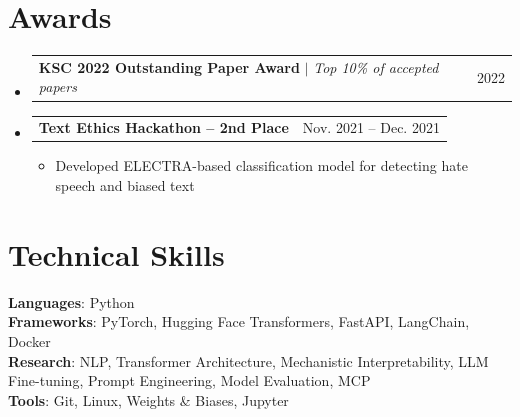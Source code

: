 \documentclass[letterpaper,11pt]{article}
\makeatletter
\newcommand{\resumeItem}[1]{
  \item\small{
    {#1 \vspace{-2pt}}
  }
}
\newcommand{\resumeProjectHeading}[2]{
    \item
    \begin{tabular*}{0.97\textwidth}{l@{\extracolsep{\fill}}r}
      \small#1 & #2 \\
    \end{tabular*}\vspace{-7pt}
}
\newcommand{\resumeSubHeadingListStart}{\begin{itemize}[leftmargin=0.15in, label={}]}
\newcommand{\resumeSubHeadingListEnd}{\end{itemize}}
\newcommand{\resumeItemListStart}{\begin{itemize}}
\newcommand{\resumeItemListEnd}{\end{itemize}\vspace{-5pt}}
\makeatother
\begin{document}
\section{Awards}
  \resumeSubHeadingListStart
    \resumeProjectHeading
      {\textbf{KSC 2022 Outstanding Paper Award} $|$ \emph{Top 10\% of accepted papers}}{2022}
    \resumeProjectHeading
      {\textbf{Text Ethics Hackathon -- 2nd Place}}{Nov. 2021 -- Dec. 2021}
      \resumeItemListStart
        \resumeItem{Developed ELECTRA-based classification model for detecting hate speech and biased text}
      \resumeItemListEnd
  \resumeSubHeadingListEnd

\section{Technical Skills}
 \begin{itemize}[leftmargin=0.15in, label={}]
    \small{\item{
     \textbf{Languages}{: Python} \\
     \textbf{Frameworks}{: PyTorch, Hugging Face Transformers, FastAPI, LangChain, Docker} \\
     \textbf{Research}{: NLP, Transformer Architecture, Mechanistic Interpretability, LLM Fine-tuning, Prompt Engineering, Model Evaluation, MCP} \\
     \textbf{Tools}{: Git, Linux, Weights \& Biases, Jupyter}
    }}
 \end{itemize}

\end{document}
